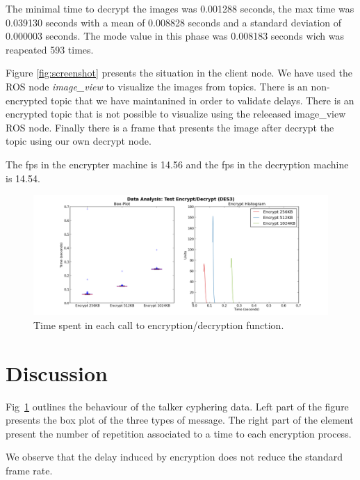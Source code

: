 \documentclass[journal,twoside]{JoPhA}
\begin{document}
The minimal time to decrypt the images was 0.001288 seconds, the max time was 0.039130 seconds with a 
mean of  0.008828 seconds and a standard deviation of 0.000003 seconds. The mode value in this phase was 0.008183 seconds wich was reapeated 593 times. 



Figure \ref{fig:screenshot} presents the situation in the client node. We have used the ROS node {\em image\_view} to visualize the images from topics.  There is an non-encrypted topic that we have maintanined in order to validate delays. There is an encrypted topic that is not possible to visualize using the releeased image\_view ROS node. Finally there is a frame that presents the image after decrypt the topic using our own decrypt node. 


The fps in the encrypter machine is 14.56 and the fps in the decryption machine is 14.54.






\begin{figure}[ht]
    \centering
    \includegraphics[width=.9\textwidth]{Outline_encryption_text.png}
    \caption{Time spent in each call to encryption/decryption function.}
  \label{fig:text_encryption_time}
\end{figure}


\section{Discussion}

Fig~\ref{fig:text_encryption_time} outlines the behaviour of the talker cyphering data. Left part of the figure presents the box plot of the three types of message. The right part of the element present the number of repetition associated to a time to each encryption process.



We observe that the delay induced by encryption does not reduce the standard frame rate. 
\end{document}
